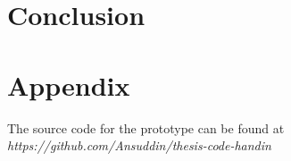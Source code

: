 \chapter{Conclusion} \label{conclusion}


\chapter*{Appendix}

The source code for the prototype can be found at \emph{https://github.com/Ansuddin/thesis-code-handin}


%


\nocite{*}



